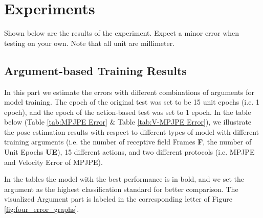 \documentclass[10pt,twocolumn,letterpaper]{article}
\begin{document}

\section{Experiments}

Shown below are the results of the experiment. Expect a minor error when testing on your own. Note that all
unit are millimeter.

\subsection{Argument-based Training Results}

In this part we estimate the errors with different combinations of arguments for model training. The epoch of the original test was set to 
be 15 unit epochs (i.e. 1 epoch), and the epoch of the action-based test was set to 1 epoch. In the table below (Table \ref{tab:MPJPE Error} \&
Table \ref{tab:V-MPJPE Error}), we illustrate the pose estimation results with respect to different types of model with different
training arguments (i.e. the number of receptive field Frames \textbf{F}, the number of Unit Epochs \textbf{UE}),
15 different actions, and two different protocols (i.e. MPJPE and Velocity Error of MPJPE).

In the tables the model with the best performance is in bold, and we set the argument as the highest classification standard
for better comparison. The visualized Argument part is labeled in the corresponding letter of Figure \ref{fig:four_error_graphs}.
\end{document}
